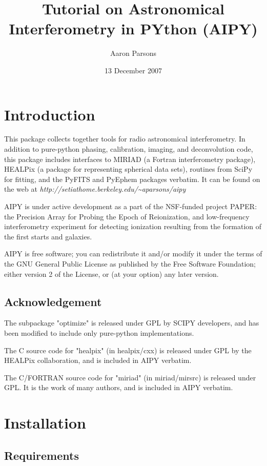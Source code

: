 \documentclass[10pt]{article}
\title{Tutorial on Astronomical Interferometry in PYthon (AIPY)}
\author{Aaron Parsons}
\date{13 December 2007}
\begin{document}
\maketitle
\tableofcontents 

\section{Introduction}

This package collects together tools for radio astronomical interferometry.  In
addition to pure-python phasing, calibration, imaging, and
deconvolution code, this package includes interfaces to MIRIAD (a Fortran
interferometry package), HEALPix (a package for representing spherical data
sets), routines from SciPy for fitting, and the PyFITS and PyEphem packages
verbatim.  It can be found on the web at
{\it http://setiathome.berkeley.edu/\~{}aparsons/aipy}

AIPY is under active development as a part of the NSF-funded project
PAPER: the Precision Array for Probing the Epoch of Reionization, and 
low-frequency interferometry experiment for detecting ionization resulting
from the formation of the first starts and galaxies.

AIPY is free software; you can redistribute it and/or modify it under
the terms of the GNU General Public License as published by the Free Software
Foundation; either version 2 of the License, or (at your option) any later
version.

\subsection{Acknowledgement}

The subpackage "optimize" is released under GPL by SCIPY developers, and
has been modified to include only pure-python implementations.

The C source code for "healpix" (in healpix/cxx) is released under GPL
by the HEALPix collaboration, and is included in AIPY verbatim.

The C/FORTRAN source code for "miriad" (in miriad/mirsrc) is released under
GPL. It is the work of many authors, and is included in AIPY verbatim.

\section{Installation}

\subsection{Requirements}
\end{document}
